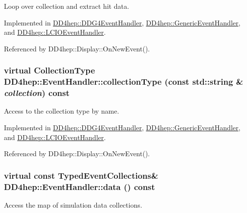Loop over collection and extract hit data. 

Implemented in \hyperlink{class_d_d4hep_1_1_d_d_g4_event_handler_a65645df58f694dea050f7d57d353dff4}{DD4hep::DDG4EventHandler}, \hyperlink{class_d_d4hep_1_1_generic_event_handler_ad521db17296b0abb05294f61f83b2019}{DD4hep::GenericEventHandler}, and \hyperlink{class_d_d4hep_1_1_l_c_i_o_event_handler_adbb8d55fec6962d692f19730fc5224fb}{DD4hep::LCIOEventHandler}.

Referenced by DD4hep::Display::OnNewEvent().\hypertarget{class_d_d4hep_1_1_event_handler_a8424ffc2056b0e23d69c81ab2496cd51}{
\subsubsection[{collectionType}]{\setlength{\rightskip}{0pt plus 5cm}virtual {\bf CollectionType} DD4hep::EventHandler::collectionType (const std::string \& {\em collection}) const}}
\label{class_d_d4hep_1_1_event_handler_a8424ffc2056b0e23d69c81ab2496cd51}


Access to the collection type by name. 

Implemented in \hyperlink{class_d_d4hep_1_1_d_d_g4_event_handler_a598b723bc7b7783532343403d6b91ff2}{DD4hep::DDG4EventHandler}, \hyperlink{class_d_d4hep_1_1_generic_event_handler_ae0471fce8b637f5825d3dab70537bdcd}{DD4hep::GenericEventHandler}, and \hyperlink{class_d_d4hep_1_1_l_c_i_o_event_handler_a1bcb144db3e2bb4b5cfe9d54a6824211}{DD4hep::LCIOEventHandler}.

Referenced by DD4hep::Display::OnNewEvent().\hypertarget{class_d_d4hep_1_1_event_handler_a263d136331d72994bcbf537d4aa16d4f}{
\subsubsection[{data}]{\setlength{\rightskip}{0pt plus 5cm}virtual const {\bf TypedEventCollections}\& DD4hep::EventHandler::data () const}}
\label{class_d_d4hep_1_1_event_handler_a263d136331d72994bcbf537d4aa16d4f}


Access the map of simulation data collections. 

